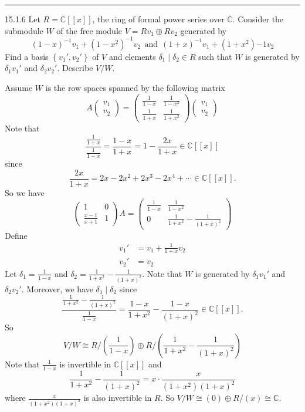 \documentclass[a4paper, 12pt]{article}
\begin{document}
\noindent\rule{7in}{2.8pt}
\begin{problem}{15.1.6}
Let \(R=\mathbb{C}[[x]]\), the ring of formal power series over \(\mathbb{C}\). Consider the submodule \(W\) of the free module \(V=Rv_1\oplus Rv_2\) generated by 
\[(1-x)^{-1}v_1+(1-x^2)^{-1}v_2\ \ \text{and}\ \ (1+x)^{-1}v_1+(1+x^2){-1}v_2\]
Find a basis \(\left\{ v_1',v_2' \right\}\) of \(V\) and elements \(\delta_1\mid \delta_2\in R\) such that \(W\) is generated by \(\delta_1v_1'\) and \(\delta_2v_2'\). Describe \(V/W\).
\end{problem}
\begin{solution}
Assume \(W\) is the row spaces spanned by the following matrix 
\[A\begin{pmatrix}
v_1\\ 
v_2
\end{pmatrix}=\begin{pmatrix}
	\frac{1}{1-x}&\frac{1}{1-x^2}\\ 
	\frac{1}{1+x}&\frac{1}{1+x^2}
\end{pmatrix}\begin{pmatrix}
	v_1\\ 
	v_2
\end{pmatrix}\]
Note that 
\[\dfrac{\frac{1}{1+x}}{\frac{1}{1-x}}=\frac{1-x}{1+x}=1-\frac{2x}{1+x}\in \mathbb{C}[[x]]\]
since 
\[\frac{2x}{1+x}=2x-2x^2+2x^3-2x^4+\cdots \in \mathbb{C}[[x]].\]
So we have 
\[\begin{pmatrix}
1&0\\ 
\frac{x-1}{x+1}&1
\end{pmatrix}A=\begin{pmatrix}
	\frac{1}{1-x}&\frac{1}{1-x^2}\\ 
	0&\frac{1}{1+x^2}-\frac{1}{(1+x)^2}
\end{pmatrix}\]
Define 
\begin{align*}
	v_1'&=v_1+\frac{1}{1+x}v_2\\
	v_2'&=v_2 
\end{align*}
Let \(\delta_1=\frac{1}{1-x}\) and \(\delta_2=\frac{1}{1+x^2}-\frac{1}{(1+x)^2}\). Note that \(W\) is generated by \(\delta_1v_1'\) and \(\delta_2v_2'\). Moreover, we have 
\(\delta_1\mid \delta_2\) since 
\[\dfrac{\frac{1}{1+x^2}-\frac{1}{(1+x)^2}}{\frac{1}{1-x}}=\frac{1-x}{1+x^2}-\frac{1-x}{(1+x)^2}\in \mathbb{C}[[x]].\]
So 
\[V/W\cong R/(\frac{1}{1-x})\oplus R/(\frac{1}{1+x^2}-\frac{1}{(1+x)^2})\]
Note that \(\frac{1}{1-x}\) is invertible in \(\mathbb{C}[[x]]\) and 
\[\frac{1}{1+x^2}-\frac{1}{(1+x)^2}=x\cdot \frac{x}{(1+x^2)(1+x)^2}\]
where \(\frac{x}{(1+x^2)(1+x)^2}\) is also invertible in \(R\). So \(V/W\cong (0)\oplus R/(x)\cong \mathbb{C}\).
\end{solution}
\end{document}

